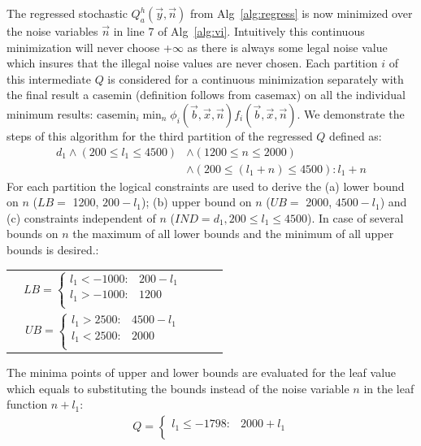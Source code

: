 \documentclass[letterpaper]{article}
\newcommand{\casemax}{\mathrm{casemax}}
\newcommand{\casemin}{\mathrm{casemin}}
\begin{document}
\begin{itemize}
The regressed stochastic $Q_a^{h}(\vec{y},\vec{n})$ from Alg~\ref{alg:regress} is now minimized over the noise variables $\vec{n}$ in line 7 of Alg~\ref{alg:vi}. Intuitively this continuous minimization will never choose +$\infty$ as there is always some legal noise value which insures that the illegal noise values are never chosen. Each partition $i$ of this intermediate $Q$ is considered for a continuous minimization separately with the final result a $\casemin$ (definition follows from $\casemax$) on all the individual minimum results: $\casemin_i \min_n \phi_i(\vec{b},\vec{x},\vec{n}) f_i(\vec{b},\vec{x},\vec{n})$.  
We demonstrate the steps of this algorithm for the third partition of the regressed $Q$ defined as:
{\footnotesize
\begin{align*}
d_1 \land (200\leq l_1\leq 4500) &\land (1200\leq n\leq 2000) \\
& \land (200\leq (l_1+n)\leq 4500): l_1 +n 
\end{align*}}
For each partition the logical constraints are used to derive the (a) lower bound on $n$ ($LB =$ 1200, $200 -l_1$); (b) upper bound on $n$ ($UB =$ 2000, $4500- l_1$)  and (c) constraints independent of $n$ ($IND= d_1, 200 \leq l_1 \leq 4500$). In case of several bounds on $n$ the maximum of all lower bounds and the minimum of all upper bounds is desired.:
{\footnotesize
\begin{center}
\begin{tabular}{r c c c l}
&
$
LB =  
\begin{cases}
 l_1 < -1000 : & 200 - l_1 \\ 
 l_1 > -1000 : & 1200 \\ 
\end{cases} 
$
\\
&
$ UB =  
\begin{cases}
l_1 >2500 : & 4500 - l_1 \\ 
l_1<2500 : & 2000 \\ 
\end{cases} 
$
\end{tabular}
\end{center}
}
The minima points of upper and lower bounds are evaluated for the leaf value which equals to substituting the bounds instead of the noise variable $n$ in the leaf function $n+ l_1$:
{\footnotesize
\begin{align}
Q =  
\begin{cases}
 l_1\leq - 1798 :&  2000 + l_1 \\

\end{cases}
\end{align}}
\end{itemize}
\end{document}
